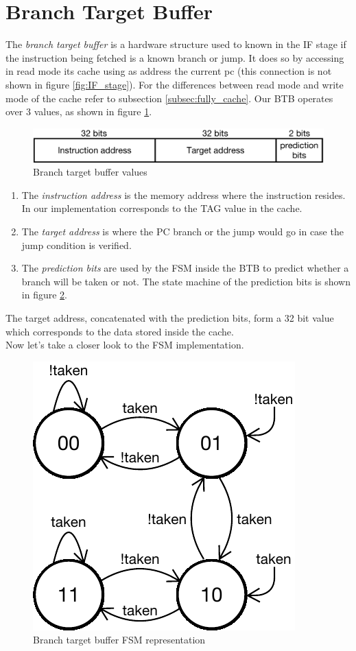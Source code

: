 \section{Branch Target Buffer}

The {\it branch target buffer} is a hardware structure used to known in the IF stage if the instruction being fetched is a known branch or jump.
It does so by accessing in read mode its cache using as address the current pc (this connection is not shown in figure \ref{fig:IF_stage}). For the differences
between read mode and write mode of the cache refer to subsection \ref{subsec:fully_cache}.
Our BTB operates over 3 values, as shown in figure \ref{fig:BTB_fields}.

\begin{figure}[!ht]
    \centering
    \includegraphics[width=\linewidth]{./chapters/figures/BTB_fields.pdf}
	\caption{Branch target buffer values}
	\label{fig:BTB_fields}
\end{figure}

\begin{enumerate}
    \item The {\it instruction address} is the memory address where the instruction resides. In our implementation corresponds to the TAG value in the cache.
    \item The {\it target address} is where the PC branch or the jump would go in case the jump condition is verified.
    \item The {\it prediction bits} are used by the FSM inside the BTB to predict whether a branch will be taken or not. The state machine of the prediction bits is shown in figure \ref{fig:BTB_FSM}.
\end{enumerate}

The target address, concatenated with the prediction bits, form a 32 bit value which corresponds to the data stored inside the cache.\\
Now let's take a closer look to the FSM implementation.

\begin{figure}[!ht]
	\centering
	\includegraphics[width=0.3\linewidth]{./chapters/figures/BTB_FSM.pdf}
    \caption{Branch target buffer FSM representation}
    \label{fig:BTB_FSM}
\end{figure}

